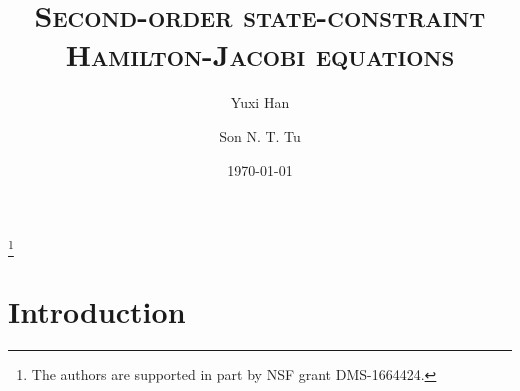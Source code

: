 \documentclass[11pt,reqno]{amsart}
\numberwithin{figure}{section}
\theoremstyle{plain}
\theoremstyle{remark}
\numberwithin{equation}{section}
\begin{document}
\title[Rate of convergence]
{\textsc{Second-order state-constraint Hamilton-Jacobi equations}}




\thanks{The authors are supported in part by NSF grant DMS-1664424.}

\begin{abstract}

\end{abstract}




\author{Yuxi Han}
\address[Y. Han]
{
Department of Mathematics, 
University of Wisconsin Madison, 480 Lincoln  Drive, Madison, WI 53706, USA}



\author{Son N. T. Tu}
\address[S. N.T. Tu]
{
Department of Mathematics, 
University of Wisconsin Madison, 480 Lincoln  Drive, Madison, WI 53706, USA}

\date{\today}


\maketitle










\section{Introduction}\label{sec:intro}
\end{document}
